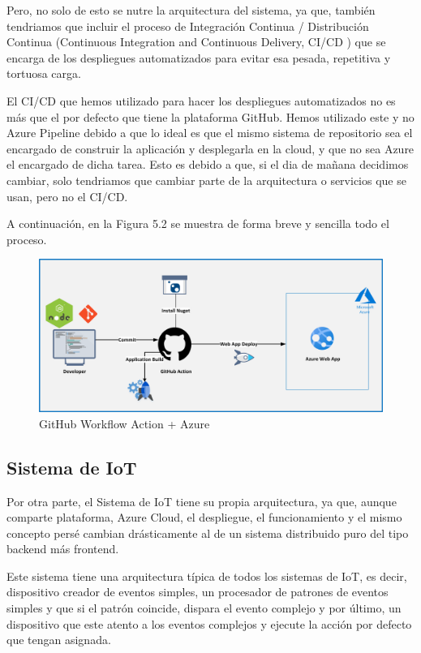 Pero, no solo de esto se nutre la arquitectura del sistema, ya que, también tendriamos que incluir el proceso de Integración Continua / Distribución Continua (Continuous Integration and Continuous Delivery, CI/CD \cite{cicd}) que se encarga de los despliegues automatizados para evitar esa pesada, repetitiva y tortuosa carga.

El CI/CD que hemos utilizado para hacer los despliegues automatizados no es más que el por defecto que tiene la plataforma GitHub. Hemos utilizado este y no Azure Pipeline debido a que lo ideal es que el mismo sistema de repositorio sea el encargado de construir la aplicación y desplegarla en la cloud, y que no sea Azure el encargado de dicha tarea. Esto es debido a que, si el dia de mañana decidimos cambiar, solo tendriamos que cambiar parte de la arquitectura o servicios que se usan, pero no el CI/CD.

A continuación, en la Figura 5.2 se muestra de forma breve y sencilla todo el proceso.

\begin{figure}[H]
    \centering
    \includegraphics[width=1\linewidth]{images/design/github azure.png}
    \caption{GitHub Workflow Action + Azure \cite{github-azure}}
\end{figure}

\subsection{Sistema de IoT}
Por otra parte, el Sistema de IoT tiene su propia arquitectura, ya que, aunque comparte plataforma, Azure Cloud, el despliegue, el funcionamiento y el mismo concepto persé cambian drásticamente al de un sistema distribuido puro del tipo backend más frontend.

Este sistema tiene una arquitectura típica de todos los sistemas de IoT, es decir, dispositivo creador de eventos simples, un procesador de patrones de eventos simples y que si el patrón coincide, dispara el evento complejo y por último, un dispositivo que este atento a los eventos complejos y ejecute la acción por defecto que tengan asignada.

